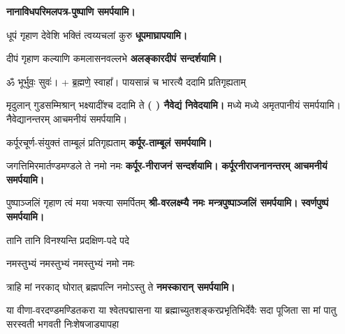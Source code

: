 \begingroup
\centering
\setlength{\columnseprule}{1pt}
\let\chapt\sect
\needspace{6em}




\endgroup

\textbf{\devAya{} नानाविध\-परिमल\-पत्र-पुष्पाणि समर्पयामि।}

\begin{center}

{धूपं गृहाण देवेशि भक्तिं त्वय्यचलां कुरु}
\textbf{\devAya{} धूपमाघ्रापयामि।}
\medskip

{दीपं गृहाण कल्याणि कमलासनवल्लभे}
\textbf{\devAya{} अलङ्कारदीपं सन्दर्शयामि।}
\medskip

ॐ भूर्भुवः॒ सुवः॑। + ब्र॒ह्मणे॒ स्वाहा᳚।
{पायसान्नं च भारत्यै ददामि प्रतिगृह्यताम्}

{मृदुलान् गुडसम्मिश्रान् भक्ष्यादींश्च ददामि ते}
\textbf{\devAya{} ( ) नैवेद्यं निवेदयामि।}
\medskip
मध्ये मध्ये अमृतपानीयं समर्पयामि।
नैवेद्यानन्तरम् आचमनीयं समर्पयामि।

{कर्पूरचूर्ण-संयुक्तं ताम्बूलं प्रतिगृह्यताम्}
\textbf{\devAya{} कर्पूर-ताम्बूलं समर्पयामि।}
\medskip

{जगत्तिमिरमार्तण्डमण्डले ते नमो नमः}
\textbf{\devAya{} कर्पूर-नीराजनं सन्दर्शयामि।}
\textbf{कर्पूरनीराजनानन्तरम् आचमनीयं समर्पयामि।}
\medskip

{पुष्पाञ्जलिं गृहाण त्वं मया भक्त्या समर्पितम्}
\textbf{श्री-वरलक्ष्म्यै नमः मन्त्रपुष्पाञ्जलिं समर्पयामि।}
\textbf{स्वर्णपुष्पं समर्पयामि।}

{तानि तानि विनश्यन्ति प्रदक्षिण-पदे पदे}

{नमस्तुभ्यं नमस्तुभ्यं नमस्तुभ्यं नमो नमः}

{त्राहि मां नरकाद् घोरात् ब्रह्मपत्नि नमोऽस्तु ते}
\textbf{\devAya{} नमस्कारान् समर्पयामि।}\medskip


{या वीणा-वरदण्डमण्डितकरा या श्वेतपद्मासना}
{या ब्रह्माच्युतशङ्करप्रभृतिभिर्देवैः सदा पूजिता}
{सा मां पातु सरस्वती भगवती निःशेषजाड्यापहा}


\end{center}
